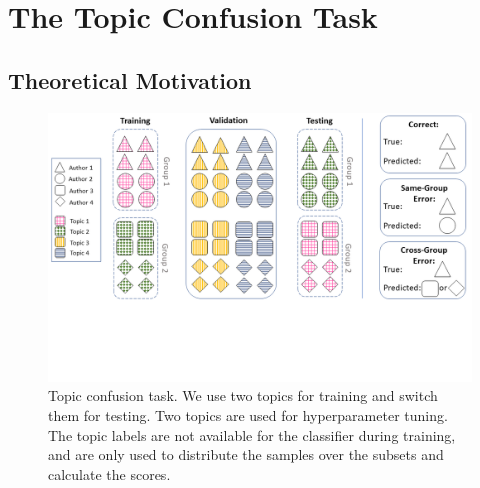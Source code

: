 \documentclass[11pt]{article}
\begin{document}
\section{The Topic Confusion Task\label{sec:confTask}}
\subsection{Theoretical Motivation}
\begin{figure}[htb!]
    \centering
    \includegraphics[width=.99\textwidth, trim={0 5.5cm 0 0},clip]{images/Presentation1.png}
    \caption{Topic confusion task. We use two topics for training and switch them for testing. Two topics are used for hyperparameter tuning. The topic labels are not available for the classifier during training, and are only used to distribute the samples over the subsets and calculate the scores.}
    \label{fig:topicConf}
\end{figure}
\end{document}
